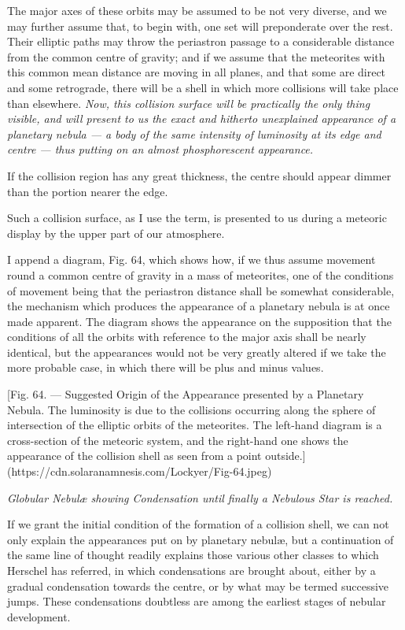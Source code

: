 \documentclass[a4paper, 12pt, oneside, polutonikogreek, english]{article}
\begin{document}
The major axes of these orbits may be assumed to be not very diverse, and we may further assume that, to begin with, one set will preponderate over the rest. Their elliptic paths may throw the periastron passage to a considerable distance from the common centre of gravity; and if we assume that the meteorites with this common mean distance are moving in all planes, and that some are direct and some retrograde, there will be a shell in which more collisions will take place than elsewhere. \emph{Now, this collision surface will be practically the only thing visible, and will present to us the exact and hitherto unexplained appearance of a planetary nebula --- a body of the same intensity of luminosity at its edge and centre --- thus putting on an almost phosphorescent appearance.}

If the collision region has any great thickness, the centre should appear dimmer than the portion nearer the edge.

Such a collision surface, as I use the term, is presented to us during a meteoric display by the upper part of our atmosphere.

I append a diagram, Fig. 64, which shows how, if we thus assume movement round a common centre of gravity in a mass of meteorites, one of the conditions of movement being that the periastron distance shall be somewhat considerable, the mechanism which produces the appearance of a planetary nebula is at once made apparent. The diagram shows the appearance on the supposition that the conditions of all the orbits with reference to the major axis shall be nearly identical, but the appearances would not be very greatly altered if we take the more probable case, in which there will be plus and minus values.

[Fig. 64. --- Suggested Origin of the Appearance presented by a Planetary Nebula. The luminosity is due to the collisions occurring along the sphere of intersection of the elliptic orbits of the meteorites. The left-hand diagram is a cross-section of the meteoric system, and the right-hand one shows the appearance of the collision shell as seen from a point outside.](https://cdn.solaranamnesis.com/Lockyer/Fig-64.jpeg)

\emph{Globular Nebulæ showing Condensation until finally a Nebulous Star is reached.}

If we grant the initial condition of the formation of a collision shell, we can not only explain the appearances put on by planetary nebulæ, but a continuation of the same line of thought readily explains those various other classes to which Herschel has referred, in which condensations are brought about, either by a gradual condensation towards the centre, or by what may be termed successive jumps. These condensations doubtless are among the earliest stages of nebular development.
\end{document}
